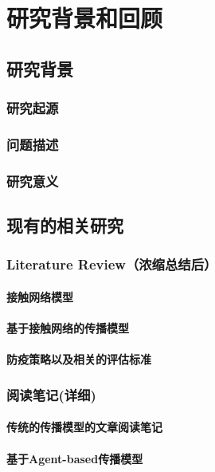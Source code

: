 
\part{研究背景和回顾}
    \chapter{研究背景}
        \section{研究起源}
        \section{问题描述}
        \section{研究意义}
    \chapter{现有的相关研究}
        \section{Literature Review（浓缩总结后）}
            \subsection{接触网络模型}
            \subsection{基于接触网络的传播模型}
            \subsection{防疫策略以及相关的评估标准}
        \section{阅读笔记(详细)}
            \subsection{传统的传播模型的文章阅读笔记}
            \subsection{基于Agent-based传播模型}
